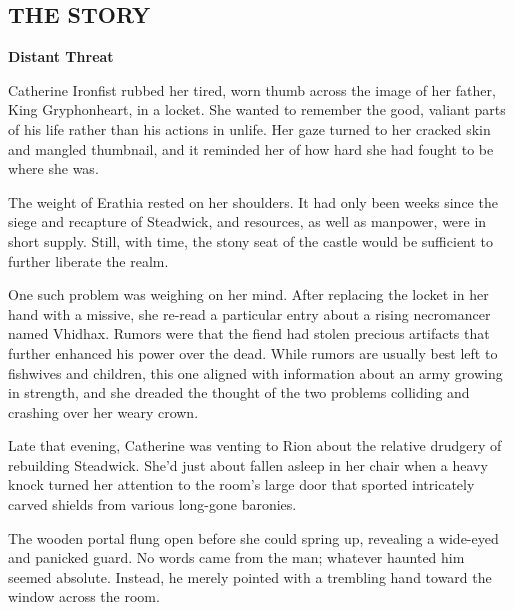 
\newpage

\begin{multicols*}{2}

\subsection*{\MakeUppercase{The story}}

\textbf{Distant Threat}

Catherine Ironfist rubbed her tired, worn thumb across the image of her father, King Gryphonheart, in a locket.
She wanted to remember the good, valiant parts of his life rather than his actions in unlife.
Her gaze turned to her cracked skin and mangled thumbnail, and it reminded her of how hard she had fought to be where she was.

The weight of Erathia rested on her shoulders.
It had only been weeks since the siege and recapture of Steadwick, and resources, as well as manpower, were in short supply.
Still, with time, the stony seat of the castle would be sufficient to further liberate the realm.

One such problem was weighing on her mind.
After replacing the locket in her hand with a missive, she re-read a particular entry about a rising necromancer named Vhidhax.
Rumors were that the fiend had stolen precious artifacts that further enhanced his power over the dead.
While rumors are usually best left to fishwives and children, this one aligned with information about an army growing in strength, and she dreaded the thought of the two problems colliding and crashing over her weary crown.

Late that evening, Catherine was venting to Rion about the relative drudgery of rebuilding Steadwick.
She'd just about fallen asleep in her chair when a heavy knock turned her attention to the room's large door that sported intricately carved shields from various long-gone baronies.

The wooden portal flung open before she could spring up, revealing a wide-eyed and panicked guard.
No words came from the man; whatever haunted him seemed absolute.
Instead, he merely pointed with a trembling hand toward the window across the room.


\end{multicols*}
